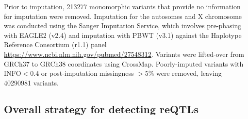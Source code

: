 Prior to imputation, 213277 monomorphic variants that provide no information for imputation were removed.
Imputation for the autosomes and X chromosome was conducted using the Sanger Imputation Service, 
which involves pre-phasing with EAGLE2 (v2.4) and imputation with PBWT (v3.1) against the Haplotype Reference Consortium (r1.1) panel \url{https://www.ncbi.nlm.nih.gov/pubmed/27548312}.
Variants were lifted-over from GRCh37 to GRCh38 coordinates using CrossMap.
Poorly-imputed variants with $\text{INFO} < 0.4$ or post-imputation missingness $> 5\%$ were removed, leaving 40290981 variants.

\subsection{Overall strategy for detecting reQTLs}

